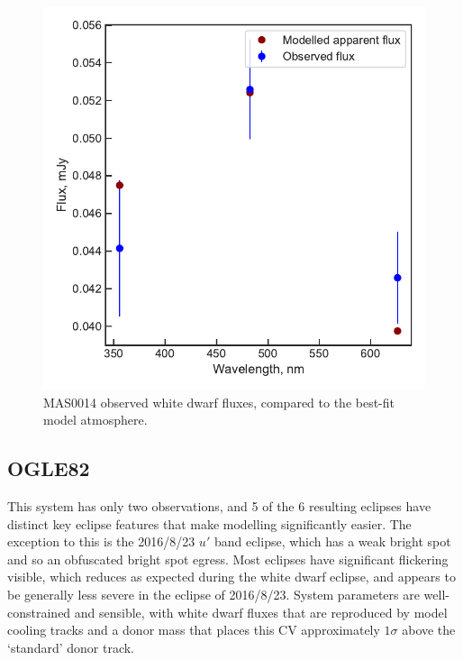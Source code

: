 \begin{figure}
    \centering
    \includegraphics[width=\textwidth]{figures/results/MASOT0014/fluxplot.pdf}
    \caption{MAS0014 observed white dwarf fluxes, compared to the best-fit model atmosphere.}
    \label{fig:MAS0014 flux plot}
\end{figure}
\clearpage



\newpage
\subsection{OGLE82}

This system has only two observations, and 5 of the 6 resulting eclipses have distinct key eclipse features that make modelling significantly easier. The exception to this is the 2016/8/23 $u'$ band eclipse, which has a weak bright spot and so an obfuscated bright spot egress.
Most eclipses have significant flickering visible, which reduces as expected during the white dwarf eclipse, and appears to be generally less severe in the eclipse of 2016/8/23.
System parameters are well-constrained and sensible, with white dwarf fluxes that are reproduced by model cooling tracks and a donor mass that places this CV approximately $1\sigma$ above the `standard' donor track.


%     

